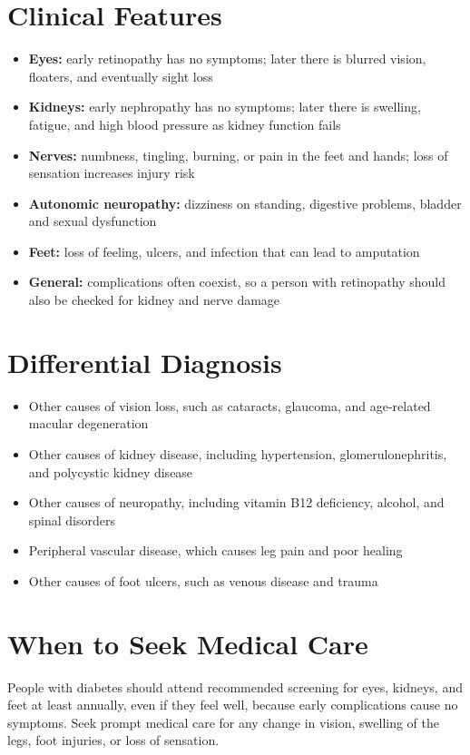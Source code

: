 \section*{Clinical Features}
\begin{itemize}
    \item \textbf{Eyes:} early retinopathy has no symptoms; later there is blurred vision, floaters, and eventually sight loss
    \item \textbf{Kidneys:} early nephropathy has no symptoms; later there is swelling, fatigue, and high blood pressure as kidney function fails
    \item \textbf{Nerves:} numbness, tingling, burning, or pain in the feet and hands; loss of sensation increases injury risk
    \item \textbf{Autonomic neuropathy:} dizziness on standing, digestive problems, bladder and sexual dysfunction
    \item \textbf{Feet:} loss of feeling, ulcers, and infection that can lead to amputation
    \item \textbf{General:} complications often coexist, so a person with retinopathy should also be checked for kidney and nerve damage
\end{itemize}

\section*{Differential Diagnosis}
\begin{itemize}
    \item Other causes of vision loss, such as cataracts, glaucoma, and age-related macular degeneration
    \item Other causes of kidney disease, including hypertension, glomerulonephritis, and polycystic kidney disease
    \item Other causes of neuropathy, including vitamin B12 deficiency, alcohol, and spinal disorders
    \item Peripheral vascular disease, which causes leg pain and poor healing
    \item Other causes of foot ulcers, such as venous disease and trauma
\end{itemize}

\section*{When to Seek Medical Care}
People with diabetes should attend recommended screening for eyes, kidneys, and feet at least annually, even if they feel well, because early complications cause no symptoms. Seek prompt medical care for any change in vision, swelling of the legs, foot injuries, or loss of sensation.

